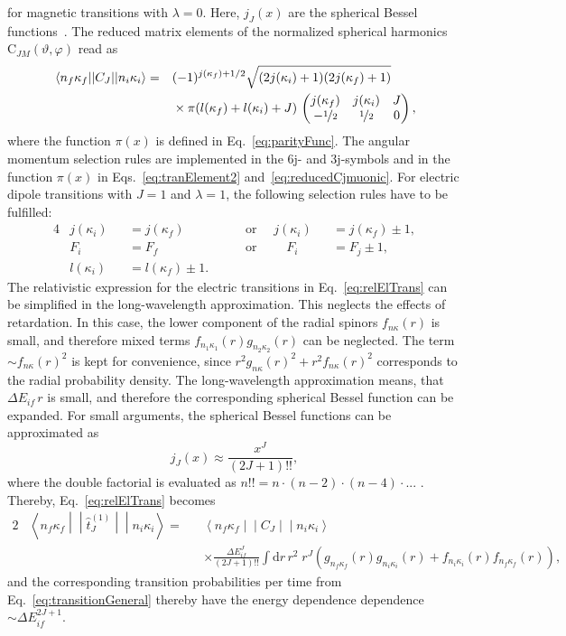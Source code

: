 for magnetic transitions with $\lambda = 0$. Here, $j_J(x)$ are the spherical Bessel functions~\cite[Eq. 10.47.3]{NIST:DLMF}.
The reduced matrix elements of the normalized spherical harmonics $\text{C}_{JM}(\vartheta,\varphi)$ read as~\cite{johnson2007}
\begin{alignat}{2}
&\left<n_f\kappa_f\middle|\middle|C_J\middle|\middle|n_i\kappa_i\right>=&&(-1)^{j(\kappa_f)+1/2}\sqrt{(2j(\kappa_i)+1)(2j(\kappa_f)+1)}\notag\\
&&& \times \pi(l(\kappa_f)+l(\kappa_i)+J)\,
\begin{pmatrix}
j(\kappa_f)&j(\kappa_i)&J\\
-\nicefrac{1}{2}&\nicefrac{1}{2}&0
\end{pmatrix},
\label{eq:reducedCjmuonic}
\end{alignat}
where the function $\pi(x)$ is defined in Eq.~\eqref{eq:parityFunc}. The angular momentum selection rules are implemented in the 6j- and 3j-symbols and in the function $\pi(x)$ in Eqs.~\eqref{eq:tranElement2} and~\eqref{eq:reducedCjmuonic}. For electric dipole transitions with $J=1$ and $\lambda=1$, the following selection rules have to be fulfilled:
\begin{alignat}{4}
&j(\kappa_i)&&=j(\kappa_f) &&\quad\text{ or }\quad j(\kappa_i)&&=j(\kappa_f)\pm 1,\\
&F_i &&= F_f &&\quad\text{ or }\quad\quad F_i&&=F_j\pm 1,\\
&l(\kappa_i)&&=l(\kappa_f)\pm 1.
\label{eq:dipoleSelectionRules}
\end{alignat}
The relativistic expression for the electric transitions in Eq.~\eqref{eq:relElTrans} can be simplified in the long-wavelength approximation. This neglects the effects of retardation. In this case, the lower component of the radial spinors $f_{n\kappa}(r)$ is small, and therefore mixed terms $f_{n_1\kappa_1}(r)g_{n_2\kappa_2}(r)$ can be neglected. The term $\sim f_{n\kappa}(r)^2$ is kept for convenience, since $r^2 g_{n\kappa}(r)^2+r^2 f_{n\kappa}(r)^2$ corresponds to the radial probability density. The long-wavelength approximation means, that $\Delta E_{if} \, r$ is small, and therefore the corresponding spherical Bessel function can be expanded. For small arguments, the spherical Bessel functions can be approximated as
\begin{equation}
j_J(x)\approx \frac{x^J}{(2J+1)!!},
\end{equation}
where the double factorial is evaluated as $n!! = n \cdot (n-2) \cdot (n-4) \cdot ...\,\,$. Thereby, Eq.~\eqref{eq:relElTrans} becomes
\begin{alignat}{2}
\label{eq:relElTransNR}
&\left< n_{f}\kappa_{f}\middle|\middle|\hat{t}^{(1)}_{J}\middle|\middle|n_{i}\kappa_{i}\right>=&&
\left<n_f\kappa_f\middle|\middle|C_J\middle|\middle|n_i\kappa_i\right>\\
&&&\times\frac{\Delta E_{if}^J}{(2J+1)!!}\int\text{d}r\,r^2 \;r^J\left(g_{n_f\kappa_f}(r)g_{n_i\kappa_i}(r)+f_{n_i\kappa_i}(r)f_{n_f\kappa_f}(r)\right),
\end{alignat}
and the corresponding transition probabilities per time from Eq.~\eqref{eq:transitionGeneral} thereby have the energy dependence dependence $\sim \Delta E_{if} ^{2J+1}$.\\

